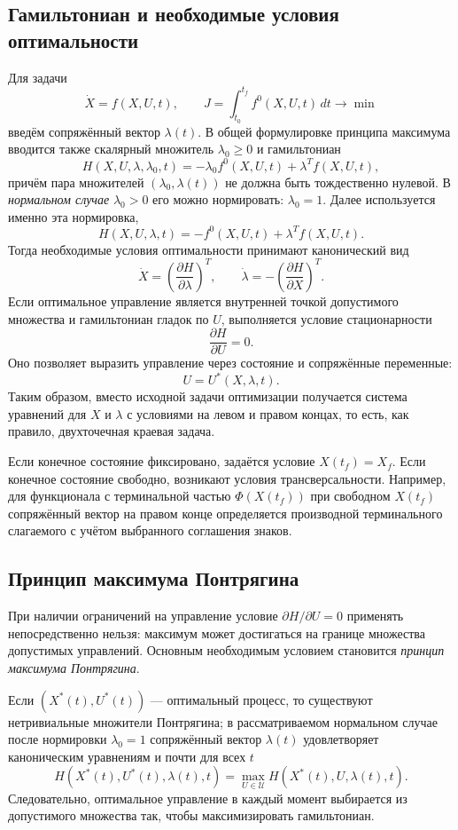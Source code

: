 \subsection{Гамильтониан и необходимые условия оптимальности}

Для задачи
\[
    \dot X=f(X,U,t),\qquad
    J=\int_{t_0}^{t_f}f^0(X,U,t)\,dt\to\min
\]
введём сопряжённый вектор $\lambda(t)$. В общей формулировке принципа
максимума вводится также скалярный множитель $\lambda_0\geq0$ и гамильтониан
\[
    H(X,U,\lambda,\lambda_0,t)
    =-\lambda_0 f^0(X,U,t)+\lambda^Tf(X,U,t),
\]
причём пара множителей $(\lambda_0,\lambda(t))$ не должна быть тождественно
нулевой. В \emph{нормальном случае} $\lambda_0>0$ его можно нормировать:
$\lambda_0=1$. Далее используется именно эта нормировка,
\[
    H(X,U,\lambda,t)
    =-f^0(X,U,t)+\lambda^Tf(X,U,t).
\]
Тогда необходимые условия оптимальности принимают канонический вид
\[
    \dot X=\left(\frac{\partial H}{\partial\lambda}\right)^T,
    \qquad
    \dot\lambda=-\left(\frac{\partial H}{\partial X}\right)^T.
\]
Если оптимальное управление является внутренней точкой допустимого множества и
гамильтониан гладок по $U$, выполняется условие стационарности
\[
    \frac{\partial H}{\partial U}=0.
\]
Оно позволяет выразить управление через состояние и сопряжённые переменные:
\[
    U=U^*(X,\lambda,t).
\]
Таким образом, вместо исходной задачи оптимизации получается система уравнений
для $X$ и $\lambda$ с условиями на левом и правом концах, то есть, как правило,
двухточечная краевая задача.

Если конечное состояние фиксировано, задаётся условие $X(t_f)=X_f$. Если
конечное состояние свободно, возникают условия трансверсальности. Например,
для функционала с терминальной частью $\Phi(X(t_f))$ при свободном $X(t_f)$
сопряжённый вектор на правом конце определяется производной терминального
слагаемого с учётом выбранного соглашения знаков.

\subsection{Принцип максимума Понтрягина}

При наличии ограничений на управление условие
$\partial H/\partial U=0$ применять непосредственно нельзя: максимум может
достигаться на границе множества допустимых управлений. Основным необходимым
условием становится \emph{принцип максимума Понтрягина}.

Если $(X^*(t),U^*(t))$ --- оптимальный процесс, то существуют нетривиальные
множители Понтрягина; в рассматриваемом нормальном случае после нормировки
$\lambda_0=1$ сопряжённый вектор $\lambda(t)$ удовлетворяет каноническим
уравнениям и почти для всех $t$
\[
    H(X^*(t),U^*(t),\lambda(t),t)
    =\max_{U\in\mathcal U}
      H(X^*(t),U,\lambda(t),t).
\]
Следовательно, оптимальное управление в каждый момент выбирается из допустимого
множества так, чтобы максимизировать гамильтониан.

